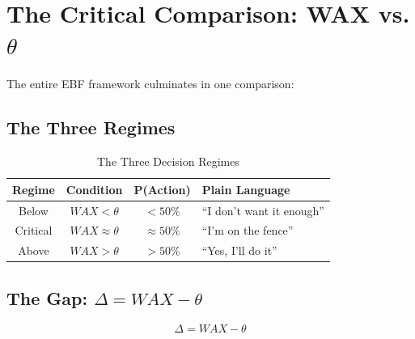\documentclass[11pt,a4paper]{book}
\theoremstyle{definition}
\theoremstyle{remark}
\begin{document}
\section{The Critical Comparison: WAX vs. $\theta$}
\label{sec:12-comparison}

The entire EBF framework culminates in one comparison:

\begin{center}
\end{center}

\subsection{The Three Regimes}

\begin{table}[htbp]
\centering
\caption{The Three Decision Regimes}
\begin{tabular}{cccp{5cm}}
\toprule
\textbf{Regime} & \textbf{Condition} & \textbf{P(Action)} & \textbf{Plain Language}\\
\midrule
\cellcolor{red!15} Below & $WAX < \theta$ & $< 50\%$ & ``I don't want it enough''\\
\cellcolor{yellow!15} Critical & $WAX \approx \theta$ & $\approx 50\%$ & ``I'm on the fence''\\
\cellcolor{green!15} Above & $WAX > \theta$ & $> 50\%$ & ``Yes, I'll do it''\\
\bottomrule
\end{tabular}
\end{table}

\subsection{The Gap: $\Delta = WAX - \theta$}

\begin{equation}
\boxed{\Delta = WAX - \theta}
\end{equation}
\end{document}
